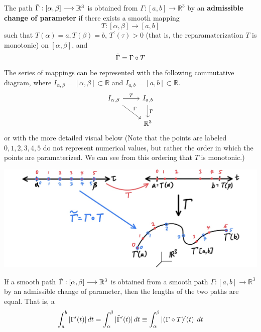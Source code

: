 \documentclass{article}
\begin{document}
      \begin{definition}
        The path $\Tilde{\Gamma}: [\alpha, \beta] \longrightarrow \mathbb{R}^3$ is obtained from $\Gamma: [a, b] \longrightarrow \mathbb{R}^3$ by an \textbf{admissible change of parameter} if there exists a smooth mapping 
        \[T: [\alpha, \beta] \longrightarrow [a, b]\]
        such that $T(\alpha) = a, T(\beta) = b$, $T^\prime (\tau) > 0$ (that is, the reparamaterization $T$ is monotonic) on $[\alpha, \beta]$, and 
        \[\Tilde{\Gamma} = \Gamma \circ T\]
        The series of mappings can be represented with the following commutative diagram, where $I_{\alpha, \beta} = [\alpha, \beta] \subset \mathbb{R}$ and $I_{a, b} = [a, b] \subset \mathbb{R}$. 
        \[
          \begin{tikzcd}
            I_{\alpha, \beta} \arrow{r}{T} \arrow{rd}{\Tilde{\Gamma}}& I_{a, b} \arrow{d}{\Gamma}\\
             & \mathbb{R}^3
          \end{tikzcd}
        \]
        or with the more detailed visual below (Note that the points are labeled $0, 1, 2, 3, 4, 5$ do not represent numerical values, but rather the order in which the points are paramaterized. We can see from this ordering that $T$ is monotonic.)
        \begin{center}
            \includegraphics[scale=0.25]{img/Admissible_Change_of_Parameter.jpg}
        \end{center}
      \end{definition}

      \begin{theorem}
      If a smooth path $\Tilde{\Gamma}: [\alpha, \beta] \longrightarrow \mathbb{R}^3$ is obtained from a smooth path $\Gamma: [a, b] \longrightarrow \mathbb{R}^3$ by an admissible change of parameter, then the lengths of the two paths are equal. That is, a
      \[\int_a^b |\Gamma^\prime (t) |\,dt = \int_\alpha^\beta |\Tilde{\Gamma}^\prime (t)|\,dt \equiv \int_\alpha^\beta |(\Gamma \circ T)^\prime (t)|\,dt\]
      \end{theorem}
\end{document}
